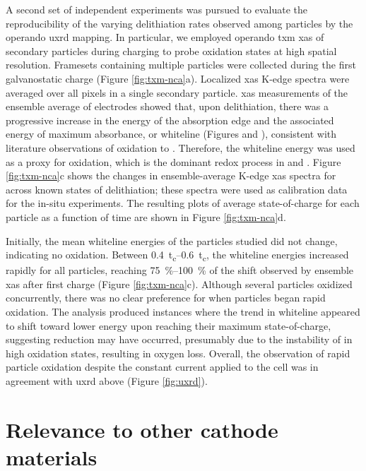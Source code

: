 \documentclass{article}
\begin{document}
A second set of independent experiments was pursued to evaluate the
reproducibility of the varying delithiation rates observed among
particles by the operando \gls{uxrd} mapping. In particular, we
employed operando \Gls{txm} \gls{xas} of \nca{} secondary particles
during charging to probe  oxidation states at high spatial
resolution. Framesets containing multiple particles were collected
during the first galvanostatic charge (Figure
\ref{fig:txm-nca}a). Localized \gls{xas} K-edge spectra were averaged
over all pixels in a single secondary particle. \gls{xas} measurements
of the ensemble average of electrodes showed that, upon delithiation,
there was a progressive increase in the energy of the absorption edge
and the associated energy of maximum absorbance, or whiteline (Figures
 and ), consistent
with literature observations of  oxidation to
\cite{deb2005,muto2009}. Therefore, the whiteline energy
was used as a proxy for  oxidation, which is the dominant redox
process in \nca{} and \nmc{}. Figure \ref{fig:txm-nca}c shows the
changes in ensemble-average  K-edge \gls{xas} spectra for
\nca{} across known states of delithiation; these spectra were used as
calibration data for the in-situ experiments. The resulting plots of
average state-of-charge for each particle as a function of time are
shown in Figure \ref{fig:txm-nca}d.

Initially, the mean whiteline energies of the particles studied did
not change, indicating no  oxidation. Between
\SIrange{0.4}{0.6}{t_c}, the whiteline energies increased rapidly for
all particles, reaching \SIrange{75}{100}{\percent} of the shift observed by ensemble \gls{xas} after first charge (Figure \ref{fig:txm-nca}c). Although several particles oxidized
concurrently, there was no clear preference for when particles began
rapid oxidation. The analysis produced instances where the trend in
whiteline appeared to shift toward lower energy upon reaching their
maximum state-of-charge, suggesting  reduction may have
occurred, presumably due to the instability of  in high
oxidation states\cite{myung2020-2}, resulting in oxygen loss. Overall,
the observation of rapid particle oxidation despite the constant
current applied to the cell was in agreement with \gls{uxrd} above
(Figure \ref{fig:uxrd}).


\newpage %
\section{Relevance to other cathode materials}
\end{document}
